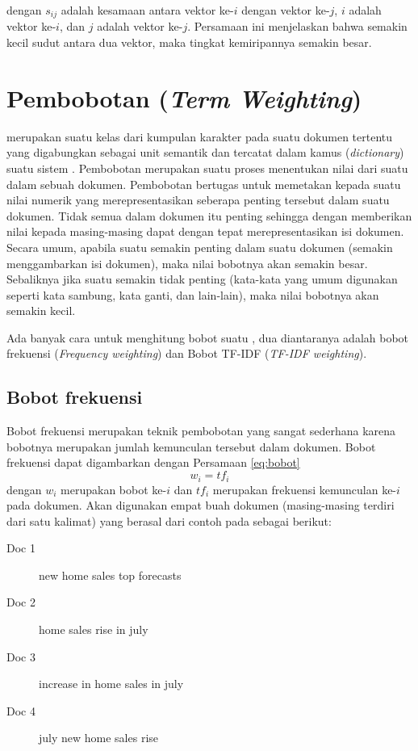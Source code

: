 dengan $s_{ij}$ adalah kesamaan antara vektor ke-$i$ dengan vektor ke-$j$, $i$ adalah vektor ke-$i$, dan $j$ adalah vektor ke-$j$. Persamaan ini menjelaskan bahwa semakin kecil sudut antara dua vektor, maka tingkat kemiripannya semakin besar.  

\section{Pembobotan \Term (\textit{Term Weighting})}
\label{sec:termWeight}
\Term merupakan suatu kelas dari kumpulan karakter pada suatu dokumen tertentu yang digabungkan sebagai unit semantik dan tercatat dalam kamus (\textit{dictionary}) suatu sistem \cite{schutze2008introduction}. Pembobotan \term merupakan suatu proses menentukan nilai dari suatu \term dalam sebuah dokumen. Pembobotan \term bertugas untuk memetakan \term kepada suatu nilai numerik yang merepresentasikan seberapa penting \term tersebut dalam suatu dokumen. Tidak semua \term dalam dokumen itu penting sehingga dengan memberikan nilai kepada masing-masing \term dapat dengan tepat merepresentasikan isi dokumen. Secara umum, apabila suatu \term semakin penting dalam suatu dokumen (semakin menggambarkan isi dokumen), maka nilai bobotnya akan semakin besar. Sebaliknya jika suatu \term semakin tidak penting (kata-kata yang umum digunakan seperti kata sambung, kata ganti, dan lain-lain), maka nilai bobotnya akan semakin kecil.

Ada banyak cara untuk menghitung bobot suatu \term, dua diantaranya adalah bobot frekuensi (\textit{Frequency weighting}) dan Bobot TF-IDF (\textit{TF-IDF weighting}).

\subsection{Bobot frekuensi}
\label{sub:freq}
Bobot frekuensi merupakan teknik pembobotan yang sangat sederhana karena bobotnya merupakan jumlah kemunculan \term tersebut dalam dokumen. Bobot frekuensi dapat digambarkan dengan Persamaan \ref{eq:bobot}
\begin{equation}
\label{eq:bobot}
w_i=tf_i
\end{equation}
dengan $w_i$ merupakan bobot \term ke-$i$ dan $tf_i$ merupakan frekuensi kemunculan \term ke-$i$ pada dokumen. Akan digunakan empat buah dokumen (masing-masing terdiri dari satu kalimat) yang berasal dari contoh pada \cite{schutze2008introduction} sebagai berikut:

\begin{description}
	\item[Doc 1] new home sales top forecasts
	\item[Doc 2] home sales rise in july
	\item[Doc 3] increase in home sales in july
	\item[Doc 4] july new home sales rise
\end{description}

